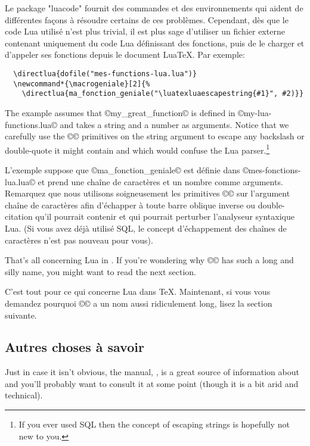 \documentclass{lltxdoc}
\begin{document}
Le package "luacode" fournit des commandes et des environnements qui aident de différentes façons à résoudre certains de ces problèmes. Cependant, dès que le code Lua utilisé n'est plus trivial, il est plus sage d'utiliser un fichier externe contenant uniquement du code Lua définissant des fonctions, puis de le charger et d'appeler ses fonctions depuis le document LuaTeX. Par exemple:
\begin{Verbatim}
  \directlua{dofile("mes-functions-lua.lua")}
  \newcommand*{\macrogeniale}[2]{%
    \directlua{ma_fonction_geniale("\luatexluaescapestring{#1}", #2)}}
\end{Verbatim}
The example assumes that ©my_great_function© is defined in
©my-lua-functions.lua© and takes a string and a number as arguments. Notice
that we carefully use the ©\luatexluaescapestring© primitives on the string
argument to escape any backslash or double-quote it might contain and which
would confuse the Lua parser.\footnote{If you ever used SQL then the concept
  of escaping strings is hopefully not new to you.}

L'exemple suppose que ©ma_fonction_geniale© est définie dans ©mes-fonctions-lua.lua© et prend une chaîne de caractères et un nombre comme arguments. Remarquez que nous utilisons soigneusement les primitives ©\luatexluaescapestring© sur l'argument chaîne de caractères afin d'échapper à toute barre oblique inverse ou double-citation qu'il pourrait contenir et qui pourrait perturber l'analyseur syntaxique Lua. (Si vous avez déjà utilisé SQL, le concept d'échappement des chaînes de caractères n'est pas nouveau pour vous).

\medskip

That's all concerning Lua in \tex. If you're wondering why
©\luatexluaescapestring© has such a long and silly name, you might want to
read the next section.

C'est tout pour ce qui concerne Lua dans TeX. Maintenant, si vous vous demandez pourquoi ©\luatexluaescapestring© a un nom aussi ridiculement long, lisez la section suivante.

\subsection{Autres choses à savoir}\label{things}

Just in case it isn't obvious, the \luatex manual, , is
a great source of information about \luatex and you'll probably want to
consult it at some point (though it is a bit arid and technical).
\end{document}

